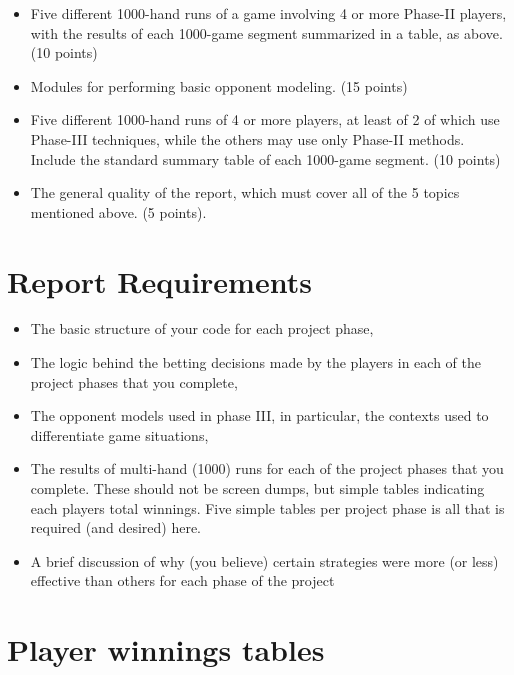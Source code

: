 \documentclass[12pt]{article}
\begin{document}
\begin{itemize}
\begin{itemize}
\item Five different 1000-hand runs of a game involving 4 or more Phase-II players, with the results of each 1000-game segment summarized in a table, as above. (10 points)

\item Modules for performing basic opponent modeling. (15 points)

\item Five different 1000-hand runs of 4 or more players, at least of 2 of which use Phase-III techniques, while the others may use only Phase-II methods. Include the standard summary table of each 1000-game segment. (10 points)

\item The general quality of the report, which must cover all of the 5 topics mentioned above. (5 points).
\end{itemize}

\section*{Report Requirements}
\begin{itemize}
\item The basic structure of your code for each project phase,

\item The logic behind the betting decisions made by the players in each of the project phases that you complete,

\item The opponent models used in phase III, in particular, the contexts used to differentiate game situations,

\item The results of multi-hand (1000) runs for each of the project phases that you complete. These should not be screen dumps, but simple tables indicating each players total winnings. Five simple tables per project phase is all that is required (and desired) here.

\item A brief discussion of why (you believe) certain strategies were more (or less) effective than others for
each phase of the project
\end{itemize}

\section*{Player winnings tables}

\end{itemize}
\end{document}
